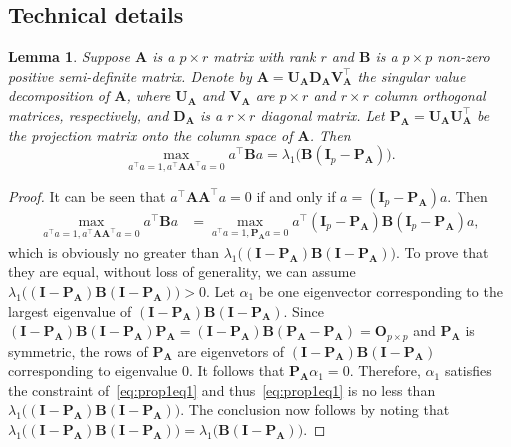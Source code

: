 \documentclass[12pt]{article} %
\newcommand{\bA}{\mathbf{A}}
\newcommand{\bB}{\mathbf{B}}
\newcommand{\bP}{\mathbf{P}}
\newcommand{\bO}{\mathbf{O}}
\newcommand{\bI}{\mathbf{I}}
\newcommand{\bU}{\mathbf{U}}
\newcommand{\bD}{\mathbf{D}}
\newcommand{\bV}{\mathbf{V}}
\newtheorem{lemma}{Lemma}
\theoremstyle{definition}
\begin{document}
\begin{appendices}
    \section{Technical details}\label{app}
\begin{lemma}\label{optProp}
    Suppose $\bA$ is a $p\times r$ matrix with rank $r$ and $\bB$ is a $p\times p$  non-zero positive semi-definite matrix.
    Denote by $\bA=\bU_\bA \bD_\bA \bV_\bA^\top$ the singular value decomposition of $\bA$, where $\bU_\bA$ and $\bV_\bA$ are $p\times r$ and $r\times r$ column orthogonal matrices, respectively, and $\bD_\bA$ is a $r\times r$ diagonal matrix.
    Let $\bP_\bA=\bU_\bA \bU_\bA^\top$ be the projection matrix onto the column space of $\bA$.
    Then
    \begin{equation}
        \max_{a^\top a=1, a^\top \bA \bA^\top a=0}a^\top \bB a=
        \lambda_{1}\big(\bB(\bI_p-\bP_\bA)\big).
    \end{equation}
\end{lemma}
\begin{proof}
    It can be seen that $a^\top \bA \bA^\top a=0$ if and only if $a= (\bI_p-\bP_\bA)a$.
    Then
    \begin{equation}\label{eq:prop1eq1}
        \begin{aligned}
        \max_{a^\top a=1, a^\top \bA \bA^\top a=0}a^\top \bB a
            &=
        \max_{a^\top a=1, \bP_\bA a=0}a^\top(\bI_p-\bP_\bA) \bB (\bI_p-\bP_\bA)a,
        \end{aligned}
    \end{equation}
    which is obviously no greater than $\lambda_1 \big((\bI-\bP_\bA)\bB(\bI-\bP_\bA)\big)$.
    To prove that they are equal,  without loss of generality, we can assume $\lambda_{1}\big((\bI-\bP_\bA)\bB(\bI-\bP_\bA)\big)>0$.
    Let $\alpha_1$ be one eigenvector corresponding to the largest eigenvalue of $(\bI-\bP_\bA)\bB(\bI-\bP_\bA)$.
    Since $(\bI-\bP_\bA)\bB(\bI-\bP_\bA)\bP_\bA=(\bI-\bP_\bA)\bB(\bP_\bA-\bP_\bA)=\bO_{p\times p}$ and $\bP_\bA$ is symmetric, the rows of $\bP_\bA$ are eigenvetors of $(\bI-\bP_\bA)\bB(\bI-\bP_\bA)$ corresponding to eigenvalue $0$.
    It follows that $\bP_\bA\alpha_1=0$.
    Therefore, $\alpha_1$ satisfies the constraint of~\eqref{eq:prop1eq1} and thus~\eqref{eq:prop1eq1} is no less than $\lambda_{1}\big((\bI-\bP_\bA)\bB(\bI-\bP_\bA)\big)$.
    The conclusion now follows by noting that $\lambda_{1}\big((\bI-\bP_\bA)\bB(\bI-\bP_\bA)\big)=\lambda_{1}\big( \bB(\bI-\bP_\bA)\big)$.
    

\end{proof}
\end{appendices}
\end{document}
